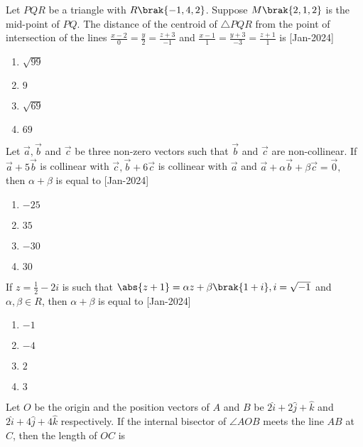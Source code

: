 \iffalse
\title{2024}
\author{EE24BTECH11021}
\section{mcq-single}
\fi
    \item Let $PQR$ be a triangle with $R\brak{-1,4,2}$. Suppose $M\brak{2,1,2}$ is the mid-point of $PQ$. The distance of the centroid of $\triangle PQR$ from the point of intersection of the lines $\frac{x-2}{0}=\frac{y}{2}=\frac{z+3}{-1}$ and $\frac{x-1}{1}=\frac{y+3}{-3}=\frac{z+1}{1}$ is
    \hfill{[Jan-2024]}
        \begin{enumerate}
            \item $\sqrt{99}$
            \item $9$
            \item $\sqrt{69}$
            \item $69$
        \end{enumerate}
    \item Let $\overrightarrow{a},\overrightarrow{b}$ and $\overrightarrow{c}$ be three non-zero vectors such that $\overrightarrow{b}$ and $\overrightarrow{c}$ are non-collinear. If $\overrightarrow{a}+5\overrightarrow{b}$ is collinear with $\overrightarrow{c},\overrightarrow{b}+6\overrightarrow{c}$ is collinear with $\overrightarrow{a}$ and $\overrightarrow{a}+\alpha\overrightarrow{b}+\beta\overrightarrow{c}=\overrightarrow{0},$ then $\alpha+\beta$ is equal to 
    \hfill{[Jan-2024]}
        \begin{enumerate}
            \item $-25$
            \item $35$
            \item $-30$
            \item $30$
        \end{enumerate}
    \item If $z=\frac{1}{2}-2i$ is such that $\abs{z+1}=\alpha z+\beta\brak{1+i},i=\sqrt{-1}$ and $\alpha,\beta\in R$, then $\alpha+\beta$ is equal to 
    \hfill{[Jan-2024]}
        \begin{enumerate}
            \item $-1$
            \item $-4$
            \item $2$
            \item $3$
        \end{enumerate}
    \item Let $O$ be the origin and the position vectors of $A$ and $B$ be $2\hat{i}+2\hat{j}+\hat{k}$ and $2\hat{i}+4\hat{j}+4\hat{k}$ respectively. If the internal bisector of $\angle AOB$ meets the line $AB$ at $C$, then the length of $OC$ is
